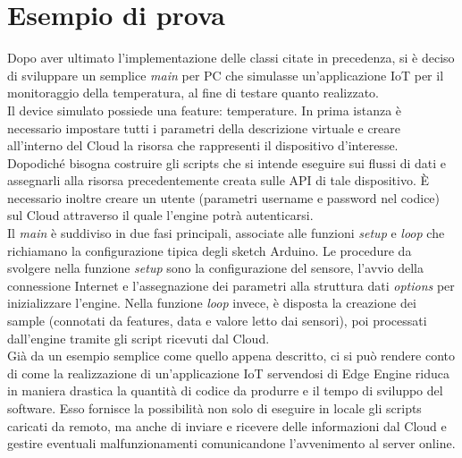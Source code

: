 \section{Esempio di prova}
Dopo aver ultimato l’implementazione delle classi citate in precedenza, si è deciso di sviluppare un semplice \textit{main} per PC che simulasse un’applicazione IoT per il monitoraggio della temperatura, al fine di testare quanto realizzato.\\
Il device simulato possiede una feature: temperature. In prima istanza è necessario impostare tutti i parametri della descrizione virtuale e creare all'interno del Cloud la risorsa che rappresenti il dispositivo d’interesse. Dopodiché bisogna costruire gli scripts che si intende eseguire sui flussi di dati e assegnarli alla risorsa precedentemente creata sulle API di tale dispositivo. È necessario inoltre creare un utente (parametri username e password nel codice) sul Cloud attraverso il quale l'engine potrà autenticarsi.\\
Il \textit{main} è suddiviso in due fasi principali, associate alle funzioni  \textit{setup} e  \textit{loop} che richiamano la configurazione tipica degli sketch Arduino. Le procedure da svolgere nella funzione  \textit{setup} sono la configurazione del sensore, l'avvio della connessione Internet e l'assegnazione dei parametri alla struttura dati \textit{options} per inizializzare l'engine. Nella funzione \textit{loop} invece, è disposta la creazione dei sample (connotati da features, data e valore letto dai sensori), poi processati dall'engine tramite gli script ricevuti dal Cloud.\\
Già da un esempio semplice come quello appena descritto, ci si può rendere conto di come la realizzazione di un'applicazione IoT servendosi di Edge Engine riduca in maniera drastica la quantità di codice da produrre e il tempo di sviluppo del software. Esso fornisce la possibilità non solo di eseguire in locale gli scripts caricati da remoto, ma anche di inviare e ricevere delle informazioni dal Cloud e gestire eventuali malfunzionamenti comunicandone l'avvenimento al server online.
